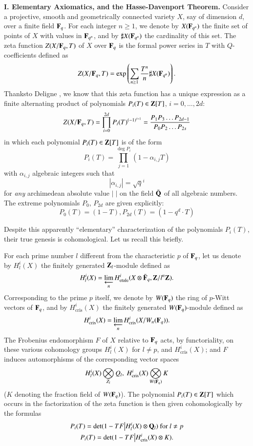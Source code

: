 \medskip
\noindent
{\bf I. Elementary Axiomatics, and the Hasse-Davenport Theorem.}
Consider a projective, smooth and geometrically connected variety $X$, say of dimension $d$, over a finite field $\mathbf{F}_{q}$. For each integer $n\geq 1$, we denote by $X(\mathbf{F}_{q^{n}})$ the finite set of points of $X$ with values in $\mathbf{F}_{q^{n}}$, and by $\sharp X(\mathbf{F}_{q^{n}})$ the cardinality of this set. The zeta function $Z(X/\mathbf{F}_{q},T)$ of $X$ over $\mathbf{F}_{q}$ is the formal power series in $T$ with $Q$-coefficients defined as
$$
Z(X/\mathbf{F}_{q},T)=\exp \left(\sum\limits_{n\geq 1}\frac{T^{n}}{n}\sharp X(\mathbf{F}_{q^{n}})\right).
$$
Thanks\pageoriginale to Deligne \cite{art6-key6}, we know that this zeta function has a unique expression as a finite alternating product of polynomials $P_i (T) \in \mathbf{Z} [T]$, $i = 0, \ldots, 2d$:
$$
Z (X/ \mathbf{F}_q, T) = \prod\limits^{2d}_{i=0} P_i (T)^{(-1)^{i+1}} = \frac{P_1 P_3 \ldots P_{2d-1}}{P_0 P_2 \ldots P_{2s}}
$$
in which each polynomial $P_i (T) \in\mathbf{Z}[T]$ is of the form 
$$
P_i (T) = \prod\limits^{\deg P_i}_{j=1} (1 -\alpha_{i,j} T)
$$
with $\alpha_{i,j}$ algebraic integers such that 
$$
|\alpha_{i,j}| = \sqrt{q}^i
$$
for \textit{any} archimedean absolute value $|\;|$ on the field $\bar{\mathbf{Q}}$ of all algebraic numbers. The extreme polynomials $P_0$, $P_{2d}$ are given explicitly:
$$
P_0 (T) = (1-T) , P_{2d} (T) = (1 - q^d \cdot T)
$$

Despite this apparently ``elementary'' characterization of the polynomials $P_i (T)$, their true genesis is cohomological. Let us recall this briefly.

For each prime number $l$ different from the characteristic $p$ of $\mathbf{F}_q$, let us denote by $H^i_l(X)$ the finitely generated $\mathbf{Z}_l$-module defined as 
$$
H^i_l (X) =  \varprojlim_n H^i_{\text{etale}} (X \otimes \bar{\mathbf{F}}_q, \mathbf{Z} / l^n \mathbf{Z} ).
$$
Corresponding to the prime $p$ itself, we denote by $W(\mathbf{F}_q)$ the ring of $p$-Witt vectors of $\mathbf{F}_q$, and by $H^i_{\text{cris}} (X)$ the finitely generated $W(\mathbf{F}_q)$-module defined as 
$$
H^i_{\text{cris}} (X) = \varprojlim_n H^i_{\text{cris}} (X / W_n (\mathbf{F}_q)).
$$
The Frobenius endomorphism $F$ of $X$ relative to $\mathbf{F}_q$ acts, by functoriality, on these various cohomology groups $H^i_l(X)$ for $l\neq p$, and $H^i_{\text{cris}} (X)$; and $F$ induces automorphisms of the corresponding vector spaces 
$$
H^i_l(X) \bigotimes_{Z_l} Q_l, \ H^i_{\text{cris}} (X) \bigotimes_{W(\bF_q)} K
$$ 
($K$ denoting the fraction field of $W(\mathbf{F}_q)$). The polynomial $P_i (T) \in \mathbf{Z} [T]$ which occurs in the factorization of the zeta function is then given cohomologically by the formulas 
\begin{gather*}
P_i(T) = \det (1 - T F \big| H^i_l(X) \otimes \mathbf{Q}_l) \text{ for } l \neq p\\
P_i (T) = \det (1 - T F \big| H^i_{\text{cris}} (X) \otimes K).
\end{gather*}\pageoriginale 

